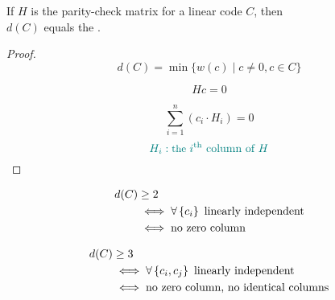 \begin{frame}{}
  \begin{theorem}
	\begin{center}
	  If $H$ is the parity-check matrix for a linear code $C$, then \\
	  $d(C)$ equals the .
	\end{center}
  \end{theorem}

  \pause
  \begin{proof}
	\pause
	\[
	  d(C) = \min \big\{ w(c) \mid c \neq 0, c \in C \big\}
	\]

	\pause
	\[
	  H c = 0
	\]

	\pause
	\[
	  \sum_{i=1}^{n} (c_i \cdot H_i) = 0 
	\]
	\[
	  \textcolor{teal}{H_i: \text{\small the } i^{\text{th}} \text{ column of } H}
	\]
  \end{proof}
\end{frame}

\begin{frame}{}
  \begin{theorem}
	\vspace{-0.40cm}
	\begin{align*}
		d(C) &\ge 2 \\
		&\iff \forall \left\{ c_i \right\} \text{ linearly independent} \\
		&\iff \text{no zero column}
	\end{align*}
  \end{theorem}

  \pause
  \vspace{0.60cm}
  \begin{theorem}
	\vspace{-0.40cm}
	\begin{align*}
		d(C) &\ge 3 \\
		&\iff \forall \left\{ c_i, c_j \right\} \text{ linearly independent} \\
		&\iff \text{no zero column, no identical columns}
	\end{align*}
  \end{theorem}
\end{frame}

